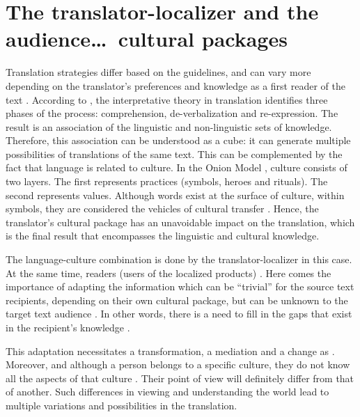 \documentclass[output=paper]{langsci/langscibook}
\begin{document}
\section{The translator-localizer and the audience\dots\ cultural packages}

Translation strategies differ based on the guidelines, and can vary more depending on the translator’s preferences and knowledge as a first reader of the text \parencite{plassard07}. According to \textcite{munday08}, the interpretative theory in translation identifies three phases of the process: comprehension, de-verbalization and re-expression. The result is an association of the linguistic and non-linguistic sets of knowledge. Therefore, this association can be understood as a cube: it can generate multiple possibilities of translations of the same text. This can be complemented by the fact that language is related to culture. In the Onion Model \parencite{hofetal10}, culture consists of two layers. The first represents practices (symbols, heroes and rituals). The second represents values. Although words exist at the surface of culture, within symbols, they are considered the vehicles of cultural transfer \parencite{hofetal10}. Hence, the translator’s cultural package has an unavoidable impact on the translation, which is the final result that encompasses the linguistic and cultural knowledge.

The language-culture combination is done by the translator-localizer in this case. At the same time, readers (users of the localized products) . Here comes the importance of adapting the information which can be \enquote{trivial} for the source text recipients, depending on their own cultural package, but can be unknown to the target text audience \parencite[107]{nord05}. In other words, there is a need to fill in the gaps that exist in the recipient’s knowledge \parencite{baker11}.

This adaptation necessitates a transformation, a mediation and a change \parencite[159]{maitland17} as . Moreover, and although a person belongs to a specific culture, they do not know all the aspects of that culture \parencite[42]{gudykunst04}. Their point of view will definitely differ from that of another. Such differences in viewing and understanding the world lead to multiple variations and possibilities in the translation. 
\end{document}
